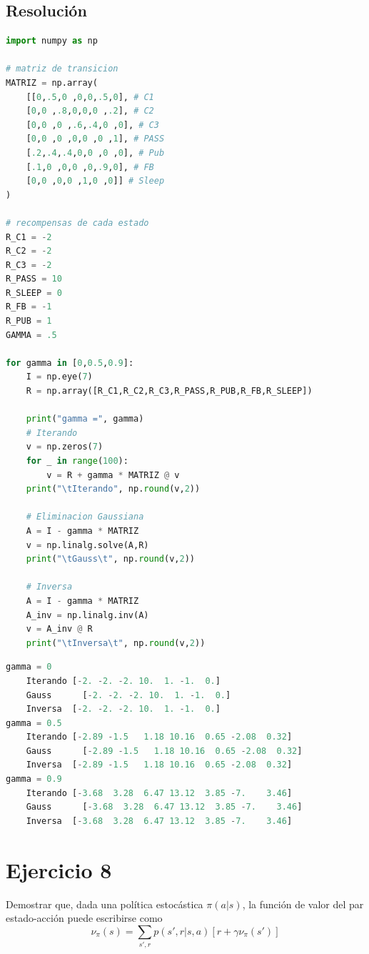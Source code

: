 \documentclass[12pt,a4paper]{article}
\begin{document}
\subsection{Resolución}

\begin{lstlisting}[language=Python]
import numpy as np

# matriz de transicion
MATRIZ = np.array(    
    [[0,.5,0 ,0,0,.5,0], # C1
    [0,0 ,.8,0,0,0 ,.2], # C2
    [0,0 ,0 ,.6,.4,0 ,0], # C3
    [0,0 ,0 ,0,0 ,0 ,1], # PASS
    [.2,.4,.4,0,0 ,0 ,0], # Pub
    [.1,0 ,0,0 ,0,.9,0], # FB
    [0,0 ,0,0 ,1,0 ,0]] # Sleep
)

# recompensas de cada estado
R_C1 = -2
R_C2 = -2
R_C3 = -2
R_PASS = 10
R_SLEEP = 0
R_FB = -1
R_PUB = 1
GAMMA = .5

for gamma in [0,0.5,0.9]:
    I = np.eye(7)
    R = np.array([R_C1,R_C2,R_C3,R_PASS,R_PUB,R_FB,R_SLEEP])
    
    print("gamma =", gamma)
    # Iterando
    v = np.zeros(7)
    for _ in range(100):
        v = R + gamma * MATRIZ @ v
    print("\tIterando", np.round(v,2))
    
    # Eliminacion Gaussiana
    A = I - gamma * MATRIZ
    v = np.linalg.solve(A,R)
    print("\tGauss\t", np.round(v,2))
    
    # Inversa
    A = I - gamma * MATRIZ
    A_inv = np.linalg.inv(A)
    v = A_inv @ R
    print("\tInversa\t", np.round(v,2))
\end{lstlisting}

\begin{lstlisting}[language=Python]
gamma = 0
	Iterando [-2. -2. -2. 10.  1. -1.  0.]
	Gauss	   [-2. -2. -2. 10.  1. -1.  0.]
	Inversa	 [-2. -2. -2. 10.  1. -1.  0.]
gamma = 0.5
	Iterando [-2.89 -1.5   1.18 10.16  0.65 -2.08  0.32]
	Gauss	   [-2.89 -1.5   1.18 10.16  0.65 -2.08  0.32]
	Inversa	 [-2.89 -1.5   1.18 10.16  0.65 -2.08  0.32]
gamma = 0.9
	Iterando [-3.68  3.28  6.47 13.12  3.85 -7.    3.46]
	Gauss	   [-3.68  3.28  6.47 13.12  3.85 -7.    3.46]
	Inversa	 [-3.68  3.28  6.47 13.12  3.85 -7.    3.46]
\end{lstlisting}

\section{Ejercicio 8}

Demostrar que, dada una política estocástica $\pi(a|s)$, la función de valor del par
estado-acción puede escribirse como
$$ \nu_\pi(s) = \sum_{s',r} p(s',r|s,a)[r + \gamma \nu_\pi(s')] $$
\end{document}
